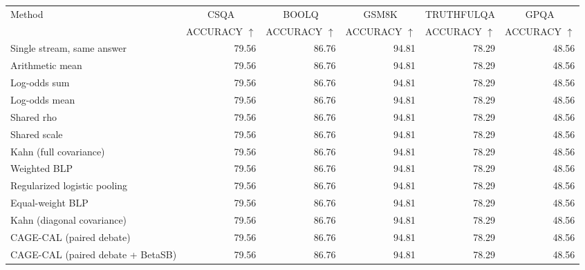 \begin{tabular}{lrrrrr}
\toprule
Method & \multicolumn{1}{c}{CSQA} & \multicolumn{1}{c}{BOOLQ} & \multicolumn{1}{c}{GSM8K} & \multicolumn{1}{c}{TRUTHFULQA} & \multicolumn{1}{c}{GPQA} \\
 & ACCURACY $\uparrow$ & ACCURACY $\uparrow$ & ACCURACY $\uparrow$ & ACCURACY $\uparrow$ & ACCURACY $\uparrow$ \\
\midrule
Single stream, same answer & 79.56 & 86.76 & 94.81 & 78.29 & 48.56 \\
Arithmetic mean & 79.56 & 86.76 & 94.81 & 78.29 & 48.56 \\
Log-odds sum & 79.56 & 86.76 & 94.81 & 78.29 & 48.56 \\
Log-odds mean & 79.56 & 86.76 & 94.81 & 78.29 & 48.56 \\
Shared rho & 79.56 & 86.76 & 94.81 & 78.29 & 48.56 \\
Shared scale & 79.56 & 86.76 & 94.81 & 78.29 & 48.56 \\
Kahn (full covariance) & 79.56 & 86.76 & 94.81 & 78.29 & 48.56 \\
Weighted BLP & 79.56 & 86.76 & 94.81 & 78.29 & 48.56 \\
Regularized logistic pooling & 79.56 & 86.76 & 94.81 & 78.29 & 48.56 \\
Equal-weight BLP & 79.56 & 86.76 & 94.81 & 78.29 & 48.56 \\
Kahn (diagonal covariance) & 79.56 & 86.76 & 94.81 & 78.29 & 48.56 \\
CAGE-CAL (paired debate) & 79.56 & 86.76 & 94.81 & 78.29 & 48.56 \\
CAGE-CAL (paired debate + BetaSB) & 79.56 & 86.76 & 94.81 & 78.29 & 48.56 \\
\bottomrule
\end{tabular}
